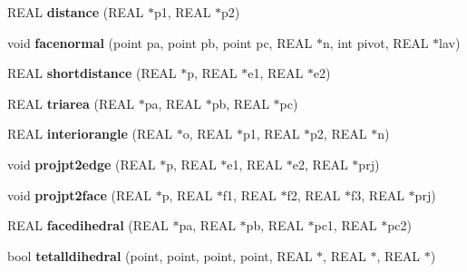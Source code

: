 \begin{DoxyCompactItemize}
\item 
\hypertarget{classtetgenmesh_a4f2849235299c81ad7d585dc0b657d80}{R\-E\-A\-L {\bfseries distance} (R\-E\-A\-L $\ast$p1, R\-E\-A\-L $\ast$p2)}\label{classtetgenmesh_a4f2849235299c81ad7d585dc0b657d80}

\item 
\hypertarget{classtetgenmesh_adef28f2839ea13688a3ac9a7184d1db8}{void {\bfseries facenormal} (point pa, point pb, point pc, R\-E\-A\-L $\ast$n, int pivot, R\-E\-A\-L $\ast$lav)}\label{classtetgenmesh_adef28f2839ea13688a3ac9a7184d1db8}

\item 
\hypertarget{classtetgenmesh_a4038b1e2dd2333374426540d0d4df0d8}{R\-E\-A\-L {\bfseries shortdistance} (R\-E\-A\-L $\ast$p, R\-E\-A\-L $\ast$e1, R\-E\-A\-L $\ast$e2)}\label{classtetgenmesh_a4038b1e2dd2333374426540d0d4df0d8}

\item 
\hypertarget{classtetgenmesh_aa05bc79cab358be88f26876be920616f}{R\-E\-A\-L {\bfseries triarea} (R\-E\-A\-L $\ast$pa, R\-E\-A\-L $\ast$pb, R\-E\-A\-L $\ast$pc)}\label{classtetgenmesh_aa05bc79cab358be88f26876be920616f}

\item 
\hypertarget{classtetgenmesh_a814827be2067d8163a688c7fc017972f}{R\-E\-A\-L {\bfseries interiorangle} (R\-E\-A\-L $\ast$o, R\-E\-A\-L $\ast$p1, R\-E\-A\-L $\ast$p2, R\-E\-A\-L $\ast$n)}\label{classtetgenmesh_a814827be2067d8163a688c7fc017972f}

\item 
\hypertarget{classtetgenmesh_ac22152fa0a43b549ae37cadff0e8c56f}{void {\bfseries projpt2edge} (R\-E\-A\-L $\ast$p, R\-E\-A\-L $\ast$e1, R\-E\-A\-L $\ast$e2, R\-E\-A\-L $\ast$prj)}\label{classtetgenmesh_ac22152fa0a43b549ae37cadff0e8c56f}

\item 
\hypertarget{classtetgenmesh_a298e94262eee21b087476e970d8324e9}{void {\bfseries projpt2face} (R\-E\-A\-L $\ast$p, R\-E\-A\-L $\ast$f1, R\-E\-A\-L $\ast$f2, R\-E\-A\-L $\ast$f3, R\-E\-A\-L $\ast$prj)}\label{classtetgenmesh_a298e94262eee21b087476e970d8324e9}

\item 
\hypertarget{classtetgenmesh_a3d8d0e63dea7f1cd6229ae100915cace}{R\-E\-A\-L {\bfseries facedihedral} (R\-E\-A\-L $\ast$pa, R\-E\-A\-L $\ast$pb, R\-E\-A\-L $\ast$pc1, R\-E\-A\-L $\ast$pc2)}\label{classtetgenmesh_a3d8d0e63dea7f1cd6229ae100915cace}

\item 
\hypertarget{classtetgenmesh_ade71f72201885054e237f5213407001f}{bool {\bfseries tetalldihedral} (point, point, point, point, R\-E\-A\-L $\ast$, R\-E\-A\-L $\ast$, R\-E\-A\-L $\ast$)}\label{classtetgenmesh_ade71f72201885054e237f5213407001f}


\end{DoxyCompactItemize}
